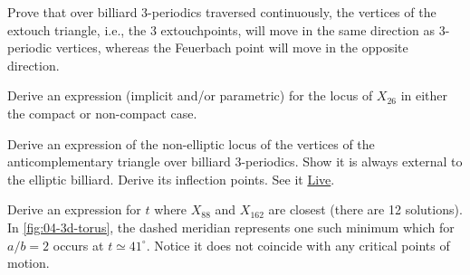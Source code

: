 \begin{question}
Prove that over billiard 3-periodics traversed continuously, the vertices of the extouch triangle, i.e., the 3 extouchpoints, will move in the same direction as 3-periodic vertices, whereas the Feuerbach point will move in the opposite direction.  
\end{question}

\begin{question}
Derive an expression (implicit and/or parametric) for the locus of $X_{26}$ in either the compact or non-compact case.
\end{question}

\begin{question}
Derive an expression of the non-elliptic locus of the vertices of the anticomplementary triangle over billiard 3-periodics. Show it is always external to the elliptic billiard. Derive its inflection points. See it \href{https://bit.ly/2RtUT00}{Live}.
\end{question}

\begin{question}
\label{que:04-x88-x162}
Derive an expression for $t$ where $X_{88}$ and $X_{162}$ are closest (there are 12 solutions). In \cref{fig:04-3d-torus}, the dashed meridian represents one such minimum which for $a/b=2$ occurs at $t{\simeq}41^\circ$. Notice it does not coincide with any critical points of motion.
\end{question}